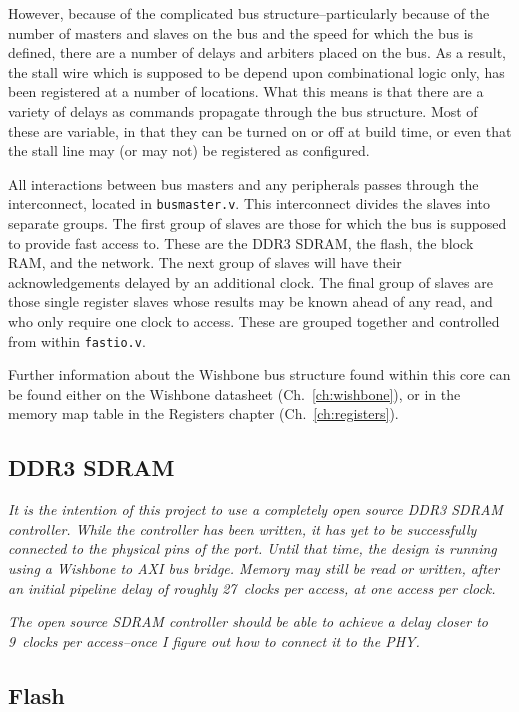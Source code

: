 \documentclass{gqtekspec}
\begin{document}
However, because of the complicated bus structure--particularly because of the
number of masters and slaves on the bus and the speed for which the bus is
defined, there are a number of delays and arbiters placed on the bus.  As a
result, the stall wire which is supposed to be depend upon combinational logic
only, has been registered at a number of locations.  What this means is that
there are a variety of delays as commands propagate through the bus structure.
Most of these are variable, in that they can be turned on or off at build time,
or even that the stall line may (or may not) be registered as configured.

All interactions between bus masters and any peripherals passes through the
interconnect, located in {\tt busmaster.v}.  This interconnect divides the
slaves into separate groups.  The first group of slaves are those for which the
bus is supposed to provide fast access to.  These are the DDR3 SDRAM, the
flash, the block RAM, and the network.  The next group of slaves will have their
acknowledgements delayed by an additional clock.  The final group of slaves
are those single register slaves whose results may be known ahead of any read,
and who only require one clock to access.  These are grouped together and
controlled from within {\tt fastio.v}.

Further information about the Wishbone bus structure found within this core
can be found either on the Wishbone datasheet (Ch.~\ref{ch:wishbone}), or in
the memory map table in the Registers chapter (Ch.~\ref{ch:registers}).

\subsection{DDR3 SDRAM}

{\em It is the intention of this project to use a completely open source
DDR3 SDRAM controller.  While the controller has been written, it has yet to
be successfully connected to the physical pins of the port.  Until that time,
the design is running using a Wishbone to AXI bus bridge.  Memory may still
be read or written, after an initial pipeline delay of roughly 27~clocks per
access, at one access per clock.}

{\em The open source SDRAM controller should be able to achieve a delay closer
to 9~clocks per access--once I figure out how to connect it to the PHY.}

\subsection{Flash}
\end{document}
